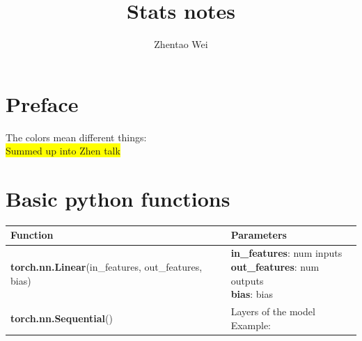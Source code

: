 \documentclass[12pt]{article}
\begin{document}
\title{Stats notes}
\author{Zhentao Wei}
\maketitle
\newpage
\thispagestyle{empty}
\newpage

\tableofcontents
\newpage

\section{Preface}
The colors mean different things:\\
\colorbox{yellow}{Summed up into Zhen talk}

\newpage
\section{Basic python functions}

\begin{table}[h!]
  \centering
  \begin{tabular}{|p{6cm}|p{10cm}|}
  \hline
  \textbf{Function} & \textbf{Parameters} \\ \hline
  {\textbf{torch.nn.Linear}(in\_features, out\_features, bias)}
  & \parbox{6cm}{
      \textbf{in\_features}: num inputs \\
      \textbf{out\_features}: num outputs \\
      \textbf{bias}: bias
    } 
  \\ \hline

  {\textbf{torch.nn.Sequential}()}
  & \parbox{6cm}{
    Layers of the model \\
    Example:
    
  } \\ \hline
  \end{tabular}
\end{table}


\newpage
\end{document}
